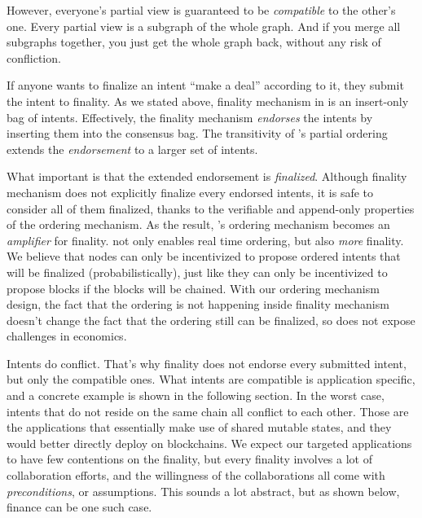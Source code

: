 However, everyone's partial view is guaranteed to be \emph{compatible} to the other's one.
Every partial view is a subgraph of the whole graph.
And if you merge all subgraphs together, you just get the whole graph back, without any risk of confliction.

If anyone wants to finalize an intent \ie ``make a deal'' according to it, they submit the intent to finality.
As we stated above, finality mechanism in \sys is an insert-only bag of intents.
Effectively, the finality mechanism \emph{endorses} the intents by inserting them into the consensus bag.
The transitivity of \sys's partial ordering extends the \emph{endorsement} to a larger set of intents.

What important is that the extended endorsement is \emph{finalized}.
Although finality mechanism does not explicitly finalize every endorsed intents, it is safe to consider all of them finalized, thanks to the verifiable and append-only properties of the ordering mechanism.
As the result, \sys's ordering mechanism becomes an \emph{amplifier} for finality.
\sys not only enables real time ordering, but also \emph{more} finality.
We believe that nodes can only be incentivized to propose ordered intents that will be finalized (probabilistically), just like they can only be incentivized to propose blocks if the blocks will be chained.
With our ordering mechanism design, the fact that the ordering is not happening inside finality mechanism doesn't change the fact that the ordering still can be finalized, so \sys does not expose challenges in economics.


Intents do conflict.
That's why finality does not endorse every submitted intent, but only the compatible ones.
What intents are compatible is application specific, and a concrete example is shown in the following section.
In the worst case, intents that do not reside on the same chain all conflict to each other.
Those are the applications that essentially make use of shared mutable states, and they would better directly deploy on blockchains.
We expect our targeted applications to have few contentions on the finality, but every finality involves a lot of collaboration efforts, and the willingness of the collaborations all come with \emph{preconditions}, or assumptions.
This sounds a lot abstract, but as shown below, finance can be one such case.

